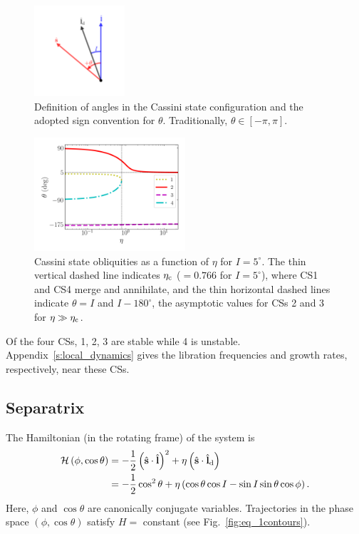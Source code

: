 \documentclass[
        fleqn,
        usenatbib,
    ]{mnras}
\newcommand*{\bm}[1]{\boldsymbol{\mathbf{#1}}}
\newcommand*{\uv}[1]{\hat{\bm{#1}}}
\newcommand*{\p}[1]{\left(#1\right)}
\begin{document}
\begin{figure}
    \centering
    \includegraphics[width=0.3\textwidth]{plots_diskdisp/2_3vec.png}
    \caption{Definition of angles in the Cassini state configuration and the
    adopted sign convention for $\theta$. Traditionally, $\theta \in [-\pi,
    \pi]$.}\label{fig:cs_vecs}
\end{figure}

\begin{figure}
    \includegraphics[width=0.5\textwidth]{plots_diskdisp/2_cs_locs.png}
    \caption{Cassini state obliquities as a function of $\eta$ for $I =
    5^\circ$. The thin vertical dashed line indicates $\eta_{\rm c}$ ($= 0.766$
    for $I = 5^\circ$), where CS1 and CS4 merge and annihilate, and the thin
    horizontal dashed lines indicate $\theta = I$ and $I - 180^\circ$, the
    asymptotic values for CSs 2 and 3 for $\eta \gg \eta_{\rm
    c}$.}\label{fig:cs_locs}
\end{figure}

Of the four CSs, 1, 2, 3 are stable while 4 is unstable.
Appendix~\ref{s:local_dynamics} gives the libration frequencies and growth rates,
respectively, near these CSs.

\subsection{Separatrix}

The Hamiltonian (in the rotating frame) of the system is
\begin{align}
    \mathcal{H}\p{\phi, \cos \theta} &= -\frac{1}{2}\p{\uv{s} \cdot \uv{l}}^2
            + \eta \p{\uv{s} \cdot \uv{l}_{\rm d}}\nonumber\\
        &= -\frac{1}{2}\cos^2\theta
            + \eta \p{\cos \theta \cos I - \sin I \sin \theta \cos \phi}
                \label{eq:H}.
\end{align}
Here, $\phi$ and $\cos \theta$ are canonically conjugate variables. Trajectories
in the phase space $\p{\phi, \cos \theta}$ satisfy $H = $ constant (see
Fig.~\ref{fig:eq_1contours}).
\end{document}
